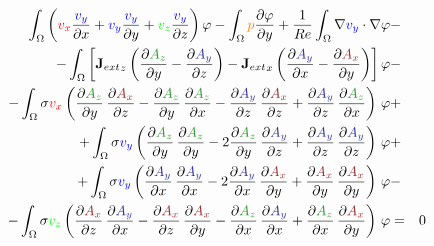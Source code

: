 \documentclass[smallextended]{svjour3}       %
\begin{document}
\begin{eqnarray}
			\int_{\Omega} \left(\textcolor{red}{v_x} \frac{\textcolor{blue}{v_y}}{\partial x} + \textcolor{blue}{v_y} \frac{\textcolor{blue}{v_y}}{\partial y} + \textcolor{green}{v_z} \frac{\textcolor{blue}{v_y}}{\partial z}\right) \varphi
			- \int_{\Omega} \textcolor{orange}{p} \frac{\partial \varphi}{\partial y}
			+ \frac{1}{Re} \int_{\Omega} \nabla \textcolor{blue}{v_y} \cdot \nabla \varphi
			\nonumber & -\\
			- \int_{\Omega} \left[{\mathbf{J}_{ext}}_z \left(\frac{\partial \textcolor{darkGreen}{A_z}}{\partial y} - \frac{\partial \textcolor{darkBlue}{A_y}}{\partial z}\right) - {\mathbf{J}_{ext}}_x \left(\frac{\partial \textcolor{darkBlue}{A_y}}{\partial x} - \frac{\partial \textcolor{darkRed}{A_x}}{\partial y}\right)\right] \varphi			
			\nonumber & -\\
			- \int_{\Omega} \sigma \textcolor{red}{v_x} \left(\frac{\partial \textcolor{darkGreen}{A_z}}{\partial y}\,\frac{\partial \textcolor{darkRed}{A_x}}{\partial z} - \frac{\partial \textcolor{darkGreen}{A_z}}{\partial y}\,\frac{\partial \textcolor{darkGreen}{A_z}}{\partial x} - \frac{\partial \textcolor{darkBlue}{A_y}}{\partial z}\,\frac{\partial \textcolor{darkRed}{A_x}}{\partial z}  + \frac{\partial \textcolor{darkBlue}{A_y}}{\partial z}\,\frac{\partial \textcolor{darkGreen}{A_z}}{\partial x} \right)\, \varphi& +\nonumber \\			
			+ \int_{\Omega} \sigma \textcolor{blue}{v_y} \left(\frac{\partial \textcolor{darkGreen}{A_z}}{\partial y}\,\frac{\partial \textcolor{darkGreen}{A_z}}{\partial y} - 2 \frac{\partial \textcolor{darkGreen}{A_z}}{\partial y}\,\frac{\partial \textcolor{darkBlue}{A_y}}{\partial z} + \frac{\partial \textcolor{darkBlue}{A_y}}{\partial z}\,\frac{\partial \textcolor{darkBlue}{A_y}}{\partial z} \right)\, \varphi& +\nonumber \\			
			+ \int_{\Omega} \sigma \textcolor{blue}{v_y} \left(\frac{\partial \textcolor{darkBlue}{A_y}}{\partial x}\,\frac{\partial \textcolor{darkBlue}{A_y}}{\partial x} - 2 \frac{\partial \textcolor{darkBlue}{A_y}}{\partial x}\,\frac{\partial \textcolor{darkRed}{A_x}}{\partial y} + \frac{\partial \textcolor{darkRed}{A_x}}{\partial y}\,\frac{\partial \textcolor{darkRed}{A_x}}{\partial y} \right)\, \varphi& -\nonumber \\			
			- \int_{\Omega} \sigma \textcolor{green}{v_z} \left(\frac{\partial \textcolor{darkRed}{A_x}}{\partial z}\,\frac{\partial \textcolor{darkBlue}{A_y}}{\partial x} - \frac{\partial \textcolor{darkRed}{A_x}}{\partial z}\,\frac{\partial \textcolor{darkRed}{A_x}}{\partial y} - \frac{\partial \textcolor{darkGreen}{A_z}}{\partial x}\,\frac{\partial \textcolor{darkBlue}{A_y}}{\partial x}  + \frac{\partial \textcolor{darkGreen}{A_z}}{\partial x}\,\frac{\partial \textcolor{darkRed}{A_x}}{\partial y} \right)\, \varphi& = & 0 \\			

\end{eqnarray}
\end{document}
